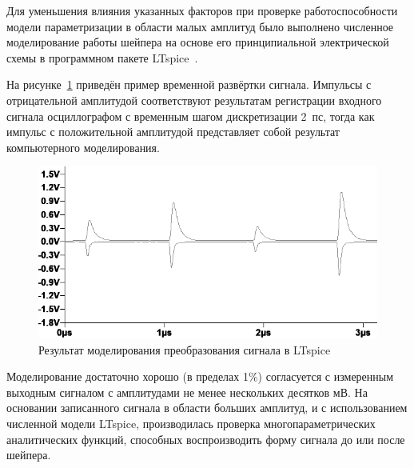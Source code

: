 Для уменьшения влияния указанных факторов при проверке работоспособности
модели параметризации в области малых амплитуд было выполнено численное
моделирование работы шейпера на основе его принципиальной электрической
схемы в программном пакете LTspice~\cite{ltspice}.


На рисунке~\ref{fig:ltspice-shaper-simulation} приведён пример временной
развёртки сигнала. Импульсы с отрицательной амплитудой соответствуют
результатам регистрации входного сигнала осциллографом с временным шагом
дискретизации 2~пс, тогда как импульс с положительной амплитудой
представляет собой результат компьютерного моделирования.

\begin{figure}
    \centering
    \includegraphics[width=0.75\linewidth]{images//illustrative/shaper-simulation.png}
    \caption{Результат моделирования преобразования сигнала в LTspice}
    \label{fig:ltspice-shaper-simulation}
\end{figure}

Моделирование достаточно хорошо (в пределах 1\%) согласуется с измеренным
выходным сигналом с амплитудами не менее нескольких десятков мВ.
На основании записанного сигнала в области больших
амплитуд, и с использованием численной модели LTspice, производилась проверка многопараметрических аналитических функций, способных воспроизводить форму
сигнала до или после шейпера.

